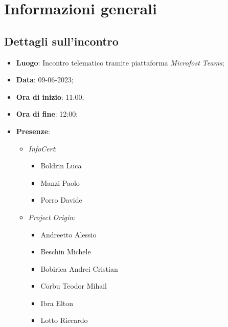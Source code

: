 \section{Informazioni generali}

\subsection{Dettagli sull'incontro}
\begin{itemize}
\item \textbf{Luogo}: Incontro telematico tramite piattaforma \textit{Microfost Teams\glo};
\item \textbf{Data}: 09-06-2023;
\item \textbf{Ora di inizio}: 11:00;
\item \textbf{Ora di fine}: 12:00;
\item \textbf{Presenze}: 
\begin{itemize}
    \item \textit{InfoCert}: \begin{itemize}
            \item Boldrin Luca 
            \item Manzi Paolo
            \item Porro Davide 
        \end{itemize}  
    \item \textit{Project Origin}:  \begin{itemize}
        \item Andreetto Alessio
        \item Beschin Michele
        \item Bobirica Andrei Cristian
        \item Corbu Teodor Mihail
        \item Ibra Elton
        \item Lotto Riccardo 
    \end{itemize}	
\end{itemize}
\end{itemize}



